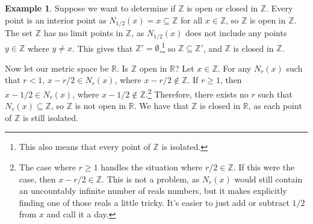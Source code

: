 \documentclass{article}
\newcommand{\R}{\mathbb{R}}
\newcommand{\Z}{\mathbb{Z}}
\theoremstyle{definition}
\newtheorem{example}{Example}[section]
\begin{document}
	\begin{example}
		Suppose we want to determine if $ \Z $ is open or closed in $ \Z $. Every point is an interior point as $ N_{1/2}(x)={x}\subseteq\Z $ for all $ x\in\Z $, so $ \Z $ is open in $ \Z $. The set $ \Z $ has no limit points in $ \Z $, as $ N_{1/2}(x) $ does not include any points $ y\in\Z $ where $ y\neq x $. This gives that $ \Z'=\emptyset $,\footnote{This also means that every point of $ \Z $ is isolated.} so $ \Z\subseteq \Z' $, and $ \Z $ is closed in $ \Z $.
		
		Now let our metric space be $ \R $. Is $ \Z $ open in $ \R $? Let $ x\in\Z $. For any $ N_r(x) $ such that $ r<1 $, $ x-r/2\in N_r(x) $, where $ x-r/2\notin\Z $. If $ r\ge 1 $, then $ x-1/2\in N_r(x) $, where $ x-1/2\notin\Z $.\footnote{The case where $ r\ge 1 $ handles the situation where $ r/2\in\Z $. If this were the case, then $ x-r/2\in\Z $. This is not a problem, as $ N_r(x) $ would still contain an uncountably infinite number of reals numbers, but it makes explicitly finding one of those reals a little tricky. It's easier to just add or subtract $ 1/2 $ from $ x $ and call it a day.} Therefore, there exists no $ r $ such that $ N_r(x)\subseteq \Z $, so $ \Z $ is not open in $ \R $. We have that $ \Z $ is closed in $ \R $, as each point of $ \Z $ is still isolated.  
	\end{example}
	
\end{document}
